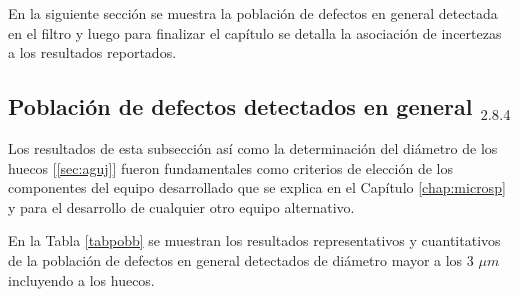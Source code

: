 En la siguiente sección se muestra la población de defectos en general detectada en el filtro y luego para finalizar el capítulo se detalla la asociación de incertezas a los resultados reportados.



\singlespacing
\subsection{Población de defectos detectados en general \href{https://github.com/jrr1984/defects\_analysis/blob/master/general\_defects\_population.ipynb}{\faGithub$_{2.8.4}$}}
\label{sec:defpob}

\hspace{0.5cm}Los resultados de esta subsección así como la determinación del diámetro de los huecos [\ref{sec:aguj}] fueron fundamentales como criterios de elección de los componentes del equipo desarrollado que se explica en el Capítulo \ref{chap:microsp} y para el desarrollo de cualquier otro equipo alternativo.

En la Tabla \ref{tabpobb} se muestran los resultados representativos y cuantitativos de la población de defectos en general detectados de diámetro mayor a los 3 $\mu m$ incluyendo a los huecos.

